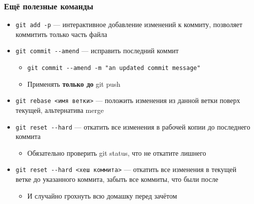 \documentclass{../../slides-style}
\begin{document}
    \begin{frame}[fragile]
        \frametitle{Ещё полезные команды}
        \begin{itemize}
            \item \verb|git add -p| --- интерактивное добавление изменений к коммиту, позволяет коммитить только часть файла
            \item \verb|git commit --amend| --- исправить последний коммит
            \begin{itemize}
                \item \verb|git commit --amend -m "an updated commit message"|
                \item Применять \textbf{только до} git push
            \end{itemize}
            \item \verb|git rebase <имя ветки>| --- положить изменения из данной ветки поверх текущей, альтернатива merge
            \item \verb|git reset --hard| --- откатить все изменения в рабочей копии до последнего коммита
            \begin{itemize}
                \item Обязательно проверить git status, что не откатите лишнего
            \end{itemize}
            \item \verb|git reset --hard <хеш коммита>| --- откатить все изменения в текущей ветке до указанного коммита, забыть все коммиты, что были после
            \begin{itemize}
                \item И случайно грохнуть всю домашку перед зачётом
            \end{itemize}
        \end{itemize}
    \end{frame}
\end{document}
